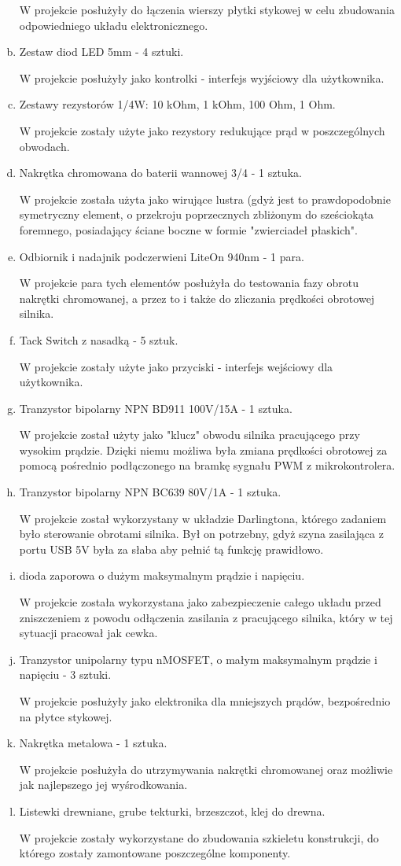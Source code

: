 \documentclass[a4paper,oneside,11pt]{report}
\begin{document}
\begin{enumerate}[a)]
W projekcie posłużyły do łączenia wierszy płytki stykowej w celu zbudowania odpowiedniego układu elektronicznego.
\item Zestaw diod LED 5mm - 4 sztuki.

W projekcie posłużyły jako kontrolki - interfejs wyjściowy dla użytkownika.
\item Zestawy rezystorów 1/4W: 10 kOhm, 1 kOhm, 100 Ohm, 1 Ohm.

W projekcie zostały użyte jako rezystory redukujące prąd w poszczególnych obwodach.
\item Nakrętka chromowana do baterii wannowej 3/4 - 1 sztuka.

W projekcie została użyta jako wirujące lustra (gdyż jest to prawdopodobnie symetryczny element, o przekroju poprzecznych zbliżonym do sześciokąta foremnego, posiadający ściane boczne w formie "zwierciadeł płaskich".
\item Odbiornik i nadajnik podczerwieni LiteOn 940nm - 1 para.

W projekcie para tych elementów posłużyła do testowania fazy obrotu nakrętki chromowanej, a przez to i także do zliczania prędkości obrotowej silnika.
\item Tack Switch z nasadką - 5 sztuk.

W projekcie zostały użyte jako przyciski - interfejs wejściowy dla użytkownika.
\item Tranzystor bipolarny NPN BD911 100V/15A - 1 sztuka.

W projekcie został użyty jako "klucz" obwodu silnika pracującego przy wysokim prądzie. Dzięki niemu możliwa była zmiana prędkości obrotowej za pomocą pośrednio podłączonego na bramkę sygnału PWM z mikrokontrolera.
\item Tranzystor bipolarny NPN BC639 80V/1A - 1 sztuka.

W projekcie został wykorzystany w układzie Darlingtona, którego zadaniem było sterowanie obrotami silnika. Był on potrzebny, gdyż szyna zasilająca z portu USB 5V była za słaba aby pełnić tą funkcję prawidłowo.
\item dioda zaporowa o dużym maksymalnym prądzie i napięciu.

W projekcie została wykorzystana jako zabezpieczenie całego układu przed zniszczeniem z powodu odłączenia zasilania z pracującego silnika, który w tej sytuacji pracował jak cewka.
\item Tranzystor unipolarny typu nMOSFET, o małym maksymalnym prądzie i napięciu - 3 sztuki.

W projekcie posłużyły jako elektronika dla mniejszych prądów, bezpośrednio na płytce stykowej.
\item Nakrętka metalowa - 1 sztuka.

W projekcie posłużyła do utrzymywania nakrętki chromowanej oraz możliwie jak najlepszego jej wyśrodkowania.

\item Listewki drewniane, grube tekturki, brzeszczot, klej do drewna.

W projekcie zostały wykorzystane do zbudowania szkieletu konstrukcji, do którego zostały zamontowane poszczególne komponenty.
\end{enumerate}
\end{document}
